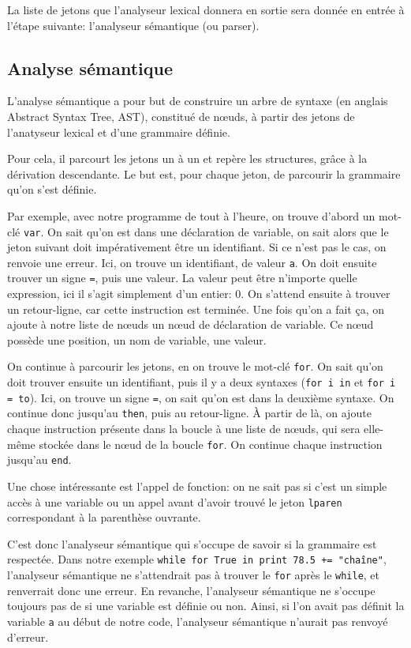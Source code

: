 \documentclass{article}
\begin{document}
La liste de jetons que l’analyseur lexical donnera en sortie sera donnée en entrée à l’étape
suivante\nobreakspace: l’analyseur sémantique (ou parser).

\subsection{Analyse sémantique}
L’analyse sémantique a pour but de construire un arbre de syntaxe (en anglais Abstract Syntax
Tree, AST), constitué de nœuds, à partir des jetons de l’anatyseur lexical et d’une grammaire
définie.

Pour cela, il parcourt les jetons un à un et repère les structures, grâce à la dérivation descendante.
Le but est, pour chaque jeton, de parcourir la grammaire qu’on s’est définie.

Par exemple, avec notre programme de tout à l’heure, on trouve d’abord un mot-clé \verb|var|. 
On sait qu’on est dans une déclaration de variable, on sait alors que le jeton suivant doit
impérativement être un identifiant. Si ce n’est pas le cas, on renvoie une erreur.
Ici, on trouve un identifiant, de valeur \verb|a|. On doit ensuite trouver un signe \verb|=|,
puis une valeur. La valeur peut être n’importe quelle expression, ici il s’agit simplement d’un
entier\nobreakspace: 0. On s’attend ensuite à trouver un retour-ligne, car cette instruction est terminée.
Une fois qu’on a fait ça, on ajoute à notre liste de nœuds un nœud de déclaration de variable. Ce
nœud possède une position, un nom de variable, une valeur.

On continue à parcourir les jetons, en on trouve le mot-clé \verb|for|. On sait qu’on doit trouver
ensuite un identifiant, puis il y a deux syntaxes (\verb|for i in| et \verb|for i = to|). Ici, on trouve
un signe \verb|=|, on sait qu’on est dans la deuxième syntaxe. On continue donc jusqu’au \verb|then|,
puis au retour-ligne. À partir de là, on ajoute chaque instruction présente dans la boucle à une liste
de nœuds, qui sera elle-même stockée dans le nœud de la boucle \verb|for|. On continue chaque instruction
jusqu’au \verb|end|.

Une chose intéressante est l’appel de fonction\nobreakspace: on ne sait pas si c’est un simple accès à une
variable ou un appel avant d’avoir trouvé le jeton \verb|lparen| correspondant à la parenthèse ouvrante.

C’est donc l’analyseur sémantique qui s’occupe de savoir si la grammaire est respectée. Dans notre
exemple \verb|while for True in print 78.5 += "chaîne"|, l’analyseur sémantique
ne s’attendrait pas à trouver le \verb|for| après le \verb|while|, et renverrait donc une erreur.
En revanche, l’analyseur sémantique ne s’occupe toujours pas de si une variable est définie ou non.
Ainsi, si l’on avait pas définit la variable \verb|a| au début de notre code, l’analyseur sémantique
n’aurait pas renvoyé d’erreur.
\end{document}
